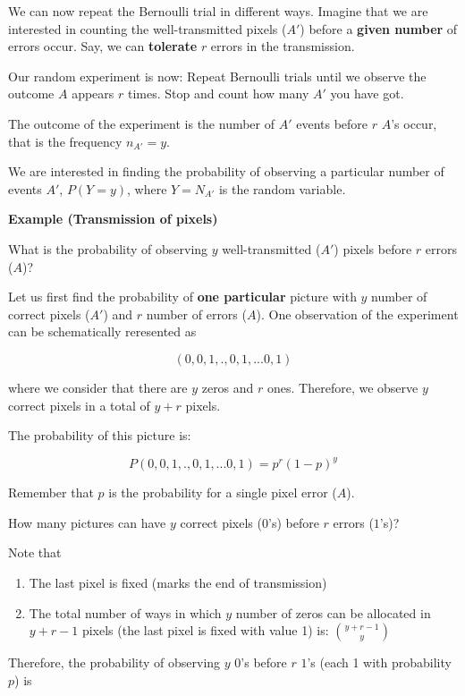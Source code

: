 \documentclass[
]{book}
\begin{document}
We can now repeat the Bernoulli trial in different ways. Imagine that we are interested in counting the well-transmitted pixels (\(A'\)) before a \textbf{given number} of errors occur. Say, we can \textbf{tolerate} \(r\) errors in the transmission.

Our random experiment is now: Repeat Bernoulli trials until we observe the outcome \(A\) appears \(r\) times. Stop and count how many \(A'\) you have got.

The outcome of the experiment is the number of \(A'\) events before \(r\) \(A\)'s occur, that is the frequency \(n_{A'}=y\).

We are interested in finding the probability of observing a particular number of events \(A'\), \(P(Y=y)\), where \(Y=N_{A'}\) is the random variable.

\textbf{Example (Transmission of pixels)}

What is the probability of observing \(y\) well-transmitted (\(A'\)) pixels before \(r\) errors (\(A\))?

Let us first find the probability of \textbf{one particular} picture with \(y\) number of correct pixels (\(A'\)) and \(r\) number of errors (\(A\)). One observation of the experiment can be schematically reresented as

\[(0,0,1,., 0,1,...0,1)\]

where we consider that there are \(y\) zeros and \(r\) ones. Therefore, we observe \(y\) correct pixels in a total of \(y + r\) pixels.

The probability of this picture is:

\[P(0,0,1,., 0,1,...0,1)=p^r(1-p)^y\]

Remember that \(p\) is the probability for a single pixel error (\(A\)).

How many pictures can have \(y\) correct pixels (\(0\)'s) before \(r\) errors (\(1\)'s)?

Note that

\begin{enumerate}
\def\labelenumi{\arabic{enumi})}
\item
  The last pixel is fixed (marks the end of transmission)
\item
  The total number of ways in which \(y\) number of zeros can be allocated in \(y + r-1\) pixels (the last pixel is fixed with value 1) is: \(\binom {y + r-1} y\)
\end{enumerate}

Therefore, the probability of observing \(y\) \(0\)'s before \(r\) \(1\)'s (each 1 with probability \(p\)) is
\end{document}
